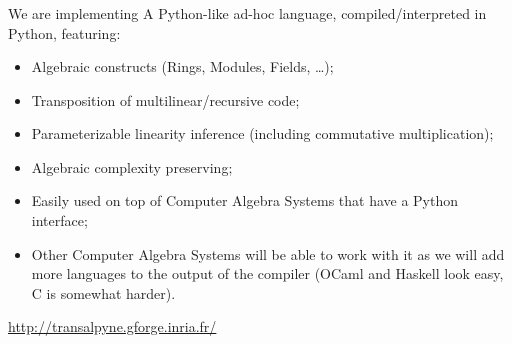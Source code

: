 \documentclass[10pt,usepdftitle=false]{beamer}
\begin{document}

  

    




\begin{frame}
  \frametitle{\tALpy{}}
  
  \begin{block}{We are implementing}
    A Python-like ad-hoc language, compiled/interpreted in Python,
    featuring:
    \begin{itemize}
    \item Algebraic constructs (Rings, Modules, Fields, \ldots);
    \item Transposition of multilinear/recursive code;
    \item Parameterizable linearity inference (including commutative
      multiplication);
    \item Algebraic complexity preserving;
    \item Easily used on top of Computer Algebra Systems that have a
      Python interface;
    \item Other Computer Algebra Systems will be able to work with it
      as we will add more languages to the output of the compiler
      (OCaml and Haskell look easy, C is somewhat harder).
    \end{itemize}
  \end{block}

  \begin{center}
    \url{http://transalpyne.gforge.inria.fr/}
  \end{center}
\end{frame}
\end{document}
